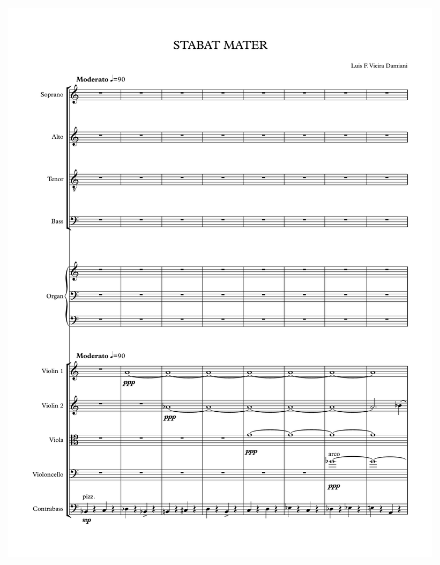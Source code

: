 \begin{figure}[h!]
    \centering
	\includegraphics[width=6.5in]{figures/Stabat_Mater_1.pdf}
\end{figure}

